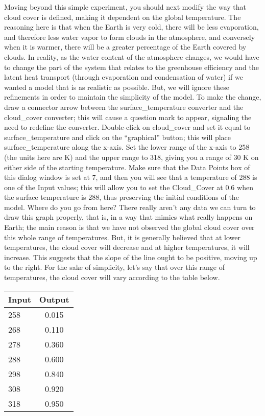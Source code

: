 \documentclass[11pt,letterpaper]{article}
\begin{document}
Moving beyond this simple experiment, you should next modify the way that cloud cover is defined, making it dependent on the global
temperature. The reasoning here is that when the Earth is very cold, there will be less evaporation, and therefore less water vapor to form
clouds in the atmosphere, and conversely when it is warmer, there will be a greater percentage of the Earth covered by clouds. In
reality, as the water content of the atmosphere changes, we would have to change the part of the system that relates to the greenhouse
efficiency and the latent heat transport (through evaporation and condensation of water) if we wanted a model that is as realistic as
possible. But, we will ignore these refinements in order to maintain the simplicity of the model.
To make the change, draw a connector arrow between the surface\_temperature converter and the cloud\_cover converter; this will cause a
question mark to appear, signaling the need to redefine the converter. Double-click on cloud\_cover and set it equal to surface\_temperature
and click on the ``graphical'' button; this will place surface\_temperature along the x-axis. Set the lower range of the x-axis to 258 (the
units here are K) and the upper range to 318, giving you a range of 30 K on either side of the starting temperature. Make sure that the
Data Points box of this dialog window is set at 7, and then you will see that a temperature of 288 is one of the Input values; this will
allow you to set the Cloud\_Cover at 0.6 when the surface temperature is 288, thus preserving the initial conditions of the model.
Where do you go from here? There really aren't any data we can turn to draw this graph properly, that is, in a way that mimics what
really happens on Earth; the main reason is that we have not observed the global cloud cover over this whole range of temperatures.
But, it is generally believed that at lower temperatures, the cloud cover will decrease and at higher temperatures, it will increase. This suggests that the slope of the line ought to be positive, moving up to the right. For the sake of simplicity,
let's say that over this range of temperatures, the cloud cover will vary according to the table below.

\begin{table}[h]
\begin{tabular}{lc}
Input & Output\\
\hline
258 & 0.015\\
268 & 0.110\\
278 & 0.360\\
288 & 0.600\\
298 & 0.840\\
308 & 0.920\\
318 & 0.950\\
\hline
\end{tabular}
\end{table}
\end{document}
